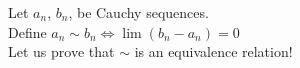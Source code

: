 \documentclass[preview]{standalone}
\begin{document}
\begin{center}
Let $a_n$, $b_n$, be Cauchy sequences.\\Define $a_n\sim b_n \iff \lim(b_n - a_n) = 0$\\Let us prove that $\sim$ is an equivalence relation!
\end{center}
\end{document}
